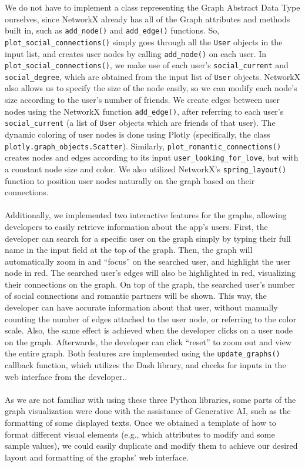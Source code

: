 \documentclass[fontsize=11pt]{article}
\begin{document}
We do not have to implement a class representing the Graph Abstract Data Type ourselves, since NetworkX already has all of the Graph attributes and methods built in, such as \texttt{add\_node()} and \texttt{add\_edge()} functions. 
So, \texttt{plot\_social\_connections()} simply goes through all the \texttt{User} objects in the input list, and creates user nodes by calling \texttt{add\_node()} on each user. 
In \texttt{plot\_social\_connections()}, we make use of each user’s \texttt{social\_current} and \texttt{social\_degree}, which are obtained from the input list of \texttt{User} objects. 
NetworkX also allows us to specify the size of the node easily, so we can modify each node’s size according to the user’s number of friends. 
We create edges between user nodes using the NetworkX function \texttt{add\_edge()}, after referring to each user’s \texttt{social\_current} (a list of \texttt{User} objects which are friends of that user). 
The dynamic coloring of user nodes is done using Plotly (specifically, the class \texttt{plotly.graph\_objects.Scatter}). 
Similarly, \texttt{plot\_romantic\_connections()} creates nodes and edges according to its input \texttt{user\_looking\_for\_love}, but with a constant node size and color. 
We also utilized NetworkX’s \texttt{spring\_layout()} function to position user nodes naturally on the graph based on their connections.
\\
\\
Additionally, we implemented two interactive features for the graphs, allowing developers to easily retrieve information about the app’s users. 
First, the developer can search for a specific user on the graph simply by typing their full name in the input field at the top of the graph. 
Then, the graph will automatically zoom in and ``focus” on the searched user, and highlight the user node in red. 
The searched user’s edges will also be highlighted in red, visualizing their connections on the graph. 
On top of the graph, the searched user’s number of social connections and romantic partners will be shown. 
This way, the developer can have accurate information about that user, without manually counting the number of edges attached to the user node, or referring to the color scale. 
Also, the same effect is achieved when the developer clicks on a user node on the graph. 
Afterwards, the developer can click ``reset” to zoom out and view the entire graph. 
Both features are implemented using the \texttt{update\_graphs()} callback function, which utilizes the Dash library, and checks for inputs in the web interface from the developer.. 
\\
\\
As we are not familiar with using these three Python libraries, some parts of the graph visualization were done with the assistance of Generative AI, such as the formatting of some displayed texts. 
Once we obtained a template of how to format different visual elements (e.g., which attributes to modify and some sample values), we could easily duplicate and modify them to achieve our desired layout and formatting of the graphs’ web interface.
\end{document}

